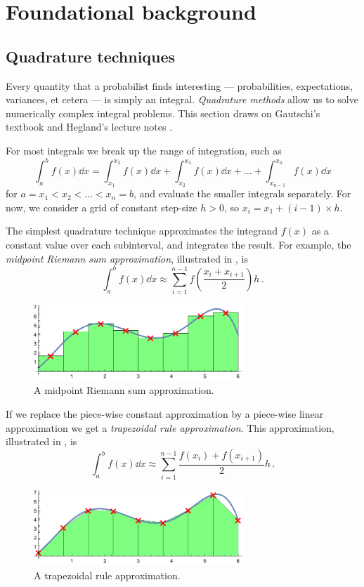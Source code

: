 \section{Foundational background}


\subsection{Quadrature techniques} \label{sec:numerical_integration}

Every quantity that a probabilist finds interesting --- probabilities, expectations, variances, et cetera --- is simply an integral. \emph{Quadrature methods} allow us to solve numerically complex integral problems. This section draws on Gautschi's textbook \cite{gautschi2011numerical} and Hegland's lecture notes \cite{Hegland2017}.

For most integrals we break up the range of integration, such as
\[ \int_a^b f(x) \dd x = \int_{x_1}^{x_2} f(x) \dd x + \int_{x_2}^{x_3} f(x) \dd x + \dots + \int_{x_{n-1}}^{x_n} f(x) \dd x \]
for $a = x_1 < x_2 < \dots < x_n = b$, and evaluate the smaller integrals separately. For now, we consider a grid of constant step-size $h > 0$, so $x_i = x_1 + (i-1) \times h$.

The simplest quadrature technique approximates the integrand $f(x)$ as a constant value over each subinterval, and integrates the result.
For example, the \emph{midpoint Riemann sum approximation}, illustrated in , is
\[ \int_a^b f(x) \dd x \approx \sum_{i=1}^{n-1} f\left( \frac{x_i + x_{i+1}}{2} \right) h \,. \]
\begin{figure}[H]
\centering
\includegraphics[width=0.7\textwidth]{images/midpoint-riemann.pdf}
\caption{A midpoint Riemann sum approximation.}
\label{fig:midpoint}
\end{figure}
If we replace the piece-wise constant approximation by a piece-wise linear approximation we get a \emph{trapezoidal rule approximation}. This approximation, illustrated in , is
\[ \int_a^b f(x) \dd x \approx \sum_{i=1}^{n-1} \frac{ f(x_i) + f(x_{i+1}) }{2} h \,. \]

\begin{figure}[H]
\centering
\includegraphics[width=0.7\textwidth]{images/trapezoidal.pdf}
\caption{A trapezoidal rule approximation.}
\label{fig:trapezoidal}
\end{figure}

